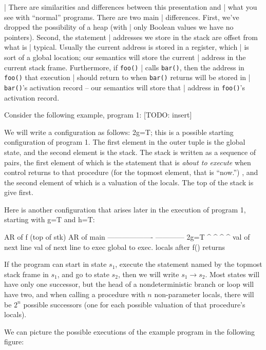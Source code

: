 \documentclass{article}
\newcommand{\code}[1]{\texttt{#1}}
\newcommand{\config}{2}{\ensuremath{\langle #1, #2 \rangle}}
\begin{document}
| There are similarities and differences between this presentation and
| what you see with ``normal'' programs. There are two main
| differences. First, we've dropped the possibility of a heap (with
| only Boolean values we have no pointers). Second, the statement
| addresses we store in the stack are offset from what is
| typical. Usually the current address is stored in a register, which
| is sort of a global location; our semantics will store the current
| address in the current stack frame. Furthermore, if \code{foo()}
| calls \code{bar()}, then the address in \code{foo()} that execution
| should return to when \code{bar()} returns will be stored in
| \code{bar()}'s activation record -- our semantics will store that
| address in \code{foo()}'s activation record.

Consider the following example, program 1:
[TODO: insert]

We will write a configuration as follows:
\config{g=T}{}; this is a possible starting
configuration of program 1. The first element in the outer tuple is
the global state, and the second element is the stack. The stack is
written as a sequence of pairs, the first element of which is the
statement that is \emph{about to execute} when control returns to that
procedure (for the topmost element, that is ``now.'') , and the second
element of which is a valuation of the locals. The top of the stack is
give first. 

Here is another configuration that arises later in the execution of
program 1, starting with g=T and h=T:

                 AR of f (top of stk)  AR of main
                 -------------------   ------------
   \config{g=T}{ }
           ^           ^         ^           ^
        val of     next line    val of      next line to exec
        global     to exec.     locals      after f() returns


If the program can start in state $s_1$, execute the statement named
by the topmost stack frame in $s_1$, and go to state $s_2$, then we
will write $s_1 \rightarrow s_2$. Most states will have only one
successor, but the head of a nondeterministic branch or loop will have
two, and when calling a procedure with $n$ non-parameter locals, there
will be $2^n$ possible successors (one for each possible valuation of
that procedure's locals).

We can picture the possible executions of the example program in the
following figure:
\end{document}
